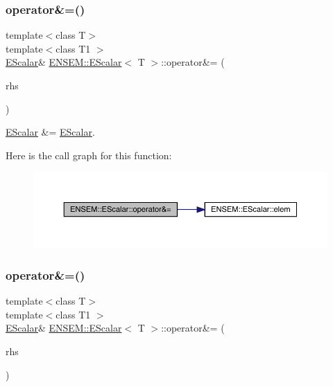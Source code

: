 \subsubsection{\texorpdfstring{operator\&=()}{operator\&=()}\hspace{0.1cm}{\footnotesize\ttfamily [2/3]}}
{\footnotesize\ttfamily template$<$class T$>$ \\
template$<$class T1 $>$ \\
\mbox{\hyperlink{classENSEM_1_1EScalar}{E\+Scalar}}\& \mbox{\hyperlink{classENSEM_1_1EScalar}{E\+N\+S\+E\+M\+::\+E\+Scalar}}$<$ T $>$\+::operator\&= (\begin{DoxyParamCaption}\item[{const \mbox{\hyperlink{classENSEM_1_1EScalar}{E\+Scalar}}$<$ T1 $>$ \&}]{rhs }\end{DoxyParamCaption})\hspace{0.3cm}{\ttfamily [inline]}}



\mbox{\hyperlink{classENSEM_1_1EScalar}{E\+Scalar}} \&= \mbox{\hyperlink{classENSEM_1_1EScalar}{E\+Scalar}}. 

Here is the call graph for this function\+:
\nopagebreak
\begin{figure}[H]
\begin{center}
\leavevmode
\includegraphics[width=350pt]{d0/d82/classENSEM_1_1EScalar_a4e16e2cecacdfefd6f01dcc360c6945b_cgraph}
\end{center}
\end{figure}
\mbox{\label{classENSEM_1_1EScalar_a4e16e2cecacdfefd6f01dcc360c6945b}} 
\subsubsection{\texorpdfstring{operator\&=()}{operator\&=()}\hspace{0.1cm}{\footnotesize\ttfamily [3/3]}}
{\footnotesize\ttfamily template$<$class T$>$ \\
template$<$class T1 $>$ \\
\mbox{\hyperlink{classENSEM_1_1EScalar}{E\+Scalar}}\& \mbox{\hyperlink{classENSEM_1_1EScalar}{E\+N\+S\+E\+M\+::\+E\+Scalar}}$<$ T $>$\+::operator\&= (\begin{DoxyParamCaption}\item[{const \mbox{\hyperlink{classENSEM_1_1EScalar}{E\+Scalar}}$<$ T1 $>$ \&}]{rhs }\end{DoxyParamCaption})\hspace{0.3cm}{\ttfamily [inline]}}




